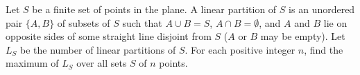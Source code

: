 Let $S$ be a finite set of points in the plane. A linear partition of $S$
is an unordered pair $\{A,B\}$ of subsets of $S$ such that $A \cup B = S$,
$A \cap B = \emptyset$, and $A$ and $B$ lie on opposite sides of some
straight line disjoint from $S$ ($A$ or $B$ may be empty). Let $L_S$ be the
number of linear partitions of $S$. For each positive integer $n$, find the
maximum of $L_S$ over all sets $S$ of $n$ points.
